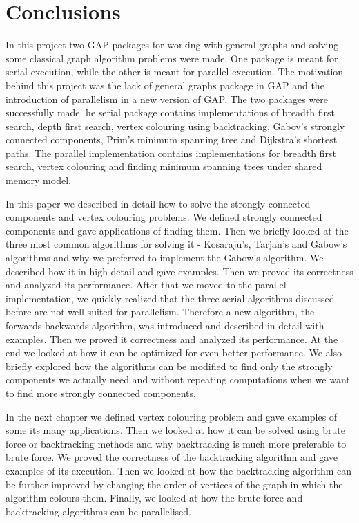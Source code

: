 \documentclass{report}
\theoremstyle{plain}
\theoremstyle{definition}
\theoremstyle{remark}
\numberwithin{definition}{chapter}
\numberwithin{example}{chapter}
\numberwithin{figure}{chapter}
\numberwithin{theorem}{chapter}
\numberwithin{lemma}{chapter}
\begin{document}
\chapter{Conclusions}

In this project two GAP packages for working with general graphs and solving some classical graph algorithm problems were made. One package is meant for serial execution, while the other is meant for parallel execution. The motivation behind this project was the lack of general graphs package in GAP and the introduction of parallelism in a new version of GAP. The two packages were successfully made. he serial package contains implementations of breadth first search, depth first search, vertex colouring using backtracking, Gabov's strongly connected components, Prim's minimum spanning tree and Dijkstra's shortest paths. The parallel implementation contains implementations for breadth first search, vertex colouring and finding minimum spanning trees under shared memory model. 

In this paper we described in detail how to solve the strongly connected components and vertex colouring problems. We defined strongly connected components and gave applications of finding them. Then we briefly looked at the three most common algorithms for solving it - Kosaraju's, Tarjan's and Gabow's algorithms and why we preferred to implement the Gabow's algorithm. We described how it in high detail and gave examples. Then we proved its correctness and analyzed its performance. After that we moved to the parallel implementation, we quickly realized that the three serial algorithms discussed before are not well suited for parallelism. Therefore a new algorithm, the forwards-backwards algorithm, was introduced and described in detail with examples. Then we proved it correctness and analyzed its performance. At the end we looked at how it can be optimized for even better performance. We also briefly explored how the algorithms can be modified to find only the strongly components we actually need and without repeating computations when we want to find more strongly connected components.

In the next chapter we defined vertex colouring problem and gave examples of some its many applications. Then we looked at how it can be solved using brute force or backtracking methods and why backtracking is much more preferable to brute force. We proved the correctness of the backtracking algorithm and gave examples of its execution. Then we looked at how the backtracking algorithm can be further improved by changing the order of vertices of the graph in which the algorithm colours them. Finally, we looked at how the brute force and backtracking algorithms can be parallelised. 



\end{document}
